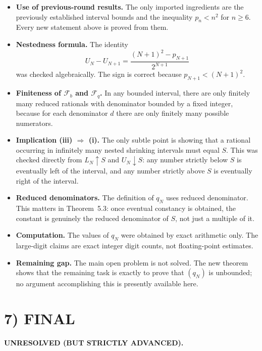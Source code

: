 \begin{itemize}
\item \textbf{Use of previous-round results.} The only imported ingredients are the previously established interval bounds and the inequality \(p_n<n^2\) for \(n\ge 6\). Every new statement above is proved from them.

\item \textbf{Nestedness formula.} The identity
\[
U_N-U_{N+1}=\frac{(N+1)^2-p_{N+1}}{2^{N+1}}
\]
was checked algebraically. The sign is correct because \(p_{N+1}<(N+1)^2\).

\item \textbf{Finiteness of \(\mathcal F_b\) and \(\mathcal F_q\).} In any bounded interval, there are only finitely many reduced rationals with denominator bounded by a fixed integer, because for each denominator \(d\) there are only finitely many possible numerators.

\item \textbf{Implication (iii) \(\Rightarrow\) (i).} The only subtle point is showing that a rational occurring in infinitely many nested shrinking intervals must equal \(S\). This was checked directly from \(L_N\uparrow S\) and \(U_N\downarrow S\): any number strictly below \(S\) is eventually left of the interval, and any number strictly above \(S\) is eventually right of the interval.

\item \textbf{Reduced denominators.} The definition of \(q_N\) uses reduced denominator. This matters in Theorem~5.3: once eventual constancy is obtained, the constant is genuinely the reduced denominator of \(S\), not just a multiple of it.

\item \textbf{Computation.} The values of \(q_N\) were obtained by exact arithmetic only. The large-digit claims are exact integer digit counts, not floating-point estimates.

\item \textbf{Remaining gap.} The main open problem is not solved. The new theorem shows that the remaining task is exactly to prove that \((q_N)\) is unbounded; no argument accomplishing this is presently available here.
\end{itemize}

\section*{7) FINAL}

\textbf{UNRESOLVED (BUT STRICTLY ADVANCED).}


